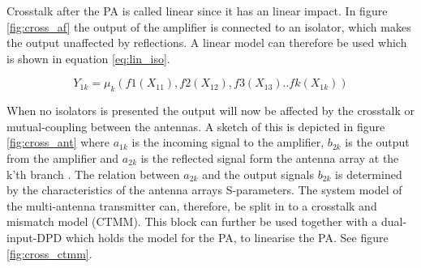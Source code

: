 Crosstalk after the PA is called linear since it has an linear impact. In figure \ref{fig:cross_af} the output of the amplifier is connected to an isolator, which makes the output unaffected by reflections. A linear model can therefore be used which is shown in equation \ref{eq:lin_iso}. 

\begin{equation} \label{eq:lin_iso}
Y_{1k} = \mu_k(f1(X_{11}),f2(X_{12}),f3(X_{13})..fk(X_{1k}))
\end{equation}     

When no isolators is presented the output will now be affected by the crosstalk or mutual-coupling between the antennas. A sketch of this is depicted in figure \ref{fig:cross_ant} where $a_{1k}$ is the incoming signal to the amplifier, $b_{2k}$ is the output from the amplifier and $a_{2k}$ is the reflected signal form the antenna array at the k'th branch \citep{Hausmair2017}. The relation between $a_{2k}$
and the output signals $b_{2k}$ is determined by the characteristics
of the antenna arrays S-parameters. The system model of the multi-antenna
transmitter can, therefore, be split in to a crosstalk and
mismatch model (CTMM). This block can further be used together with a dual-input-DPD which holds the model for the PA, to linearise the PA. See figure \ref{fig:cross_ctmm}. 


